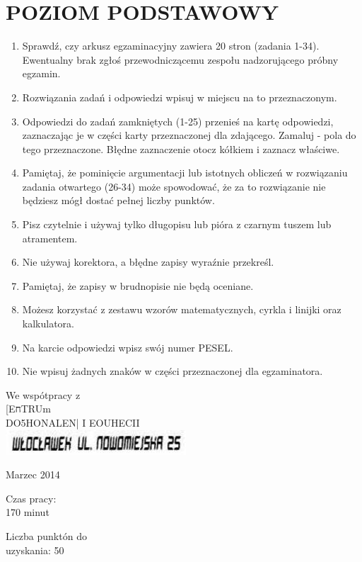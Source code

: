 \documentclass[10pt]{article}
\begin{document}
\section*{POZIOM PODSTAWOWY}
\begin{enumerate}
  \item Sprawdź, czy arkusz egzaminacyjny zawiera 20 stron (zadania 1-34). Ewentualny brak zgłoś przewodniczącemu zespołu nadzorującego próbny egzamin.
  \item Rozwiązania zadań i odpowiedzi wpisuj w miejscu na to przeznaczonym.
  \item Odpowiedzi do zadań zamkniętych (1-25) przenieś na kartę odpowiedzi, zaznaczając je w części karty przeznaczonej dla zdającego. Zamaluj - pola do tego przeznaczone. Błędne zaznaczenie otocz kółkiem i zaznacz właściwe.
  \item Pamiętaj, że pominięcie argumentacji lub istotnych obliczeń w rozwiązaniu zadania otwartego (26-34) może spowodować, że za to rozwiązanie nie będziesz mógł dostać pełnej liczby punktów.
  \item Pisz czytelnie i używaj tylko długopisu lub pióra z czarnym tuszem lub atramentem.
  \item Nie używaj korektora, a błędne zapisy wyraźnie przekreśl.
  \item Pamiętaj, że zapisy w brudnopisie nie będą oceniane.
  \item Możesz korzystać z zestawu wzorów matematycznych, cyrkla i linijki oraz kalkulatora.
  \item Na karcie odpowiedzi wpisz swój numer PESEL.
  \item Nie wpisuj żadnych znaków w części przeznaczonej dla egzaminatora.
\end{enumerate}

We wspótpracy z\\[0pt]
[EחTRUm\\
DO5HONALEN| I EOUHECII\\
\includegraphics[max width=\textwidth, center]{2024_11_21_b31e6de468170710de69g-01(1)}

Marzec 2014

Czas pracy:\\
170 minut

Liczba punktón do\\
uzyskania: 50
\end{document}
